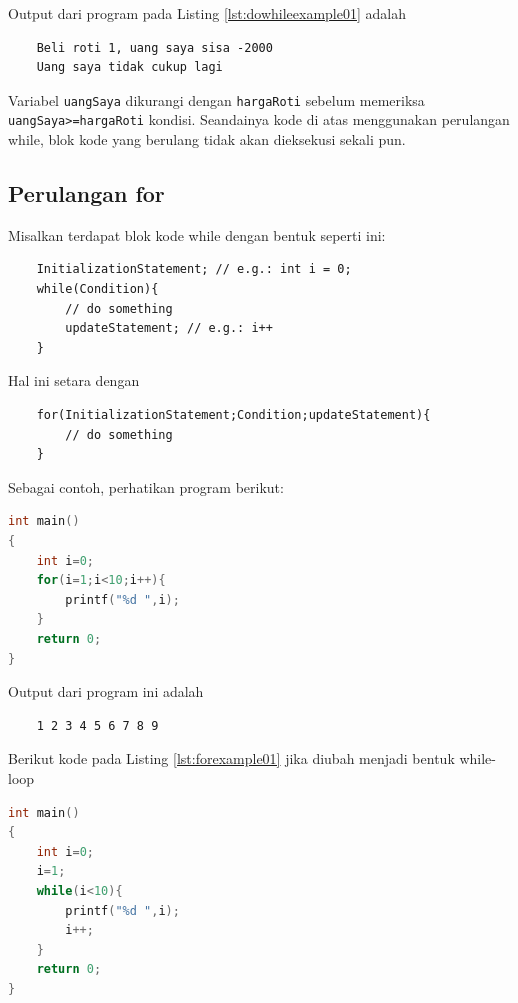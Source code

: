 Output dari program pada Listing \ref{lst:dowhileexample01} adalah
\begin{verbatim}
    Beli roti 1, uang saya sisa -2000
    Uang saya tidak cukup lagi
\end{verbatim}
Variabel \verb|uangSaya| dikurangi dengan \verb|hargaRoti| sebelum memeriksa \verb|uangSaya>=hargaRoti| kondisi.
Seandainya kode di atas menggunakan perulangan while, blok kode yang berulang tidak akan dieksekusi sekali pun.
\subsection{Perulangan for}
Misalkan terdapat blok kode while dengan bentuk seperti ini:
\begin{verbatim}
    InitializationStatement; // e.g.: int i = 0;
    while(Condition){
        // do something
        updateStatement; // e.g.: i++ 
    }
\end{verbatim}
Hal ini setara dengan
\begin{verbatim}
    for(InitializationStatement;Condition;updateStatement){
        // do something
    }
\end{verbatim}

Sebagai contoh, perhatikan program berikut:
\begin{lstlisting}[language=c,caption = Contoh Penggunaan for,label=lst:forexample01]
int main()
{
    int i=0;
    for(i=1;i<10;i++){
        printf("%d ",i);
    }
	return 0;
}
\end{lstlisting}
Output dari program ini adalah
\begin{verbatim}
    1 2 3 4 5 6 7 8 9 
\end{verbatim}
Berikut kode pada Listing \ref{lst:forexample01} jika diubah menjadi bentuk while-loop
\begin{lstlisting}[language=c,caption = For dalam bentuk while,label=lst:forwhileform01]
int main()
{
    int i=0;
    i=1;
    while(i<10){
        printf("%d ",i);
        i++;
    }
	return 0;
}
\end{lstlisting}


